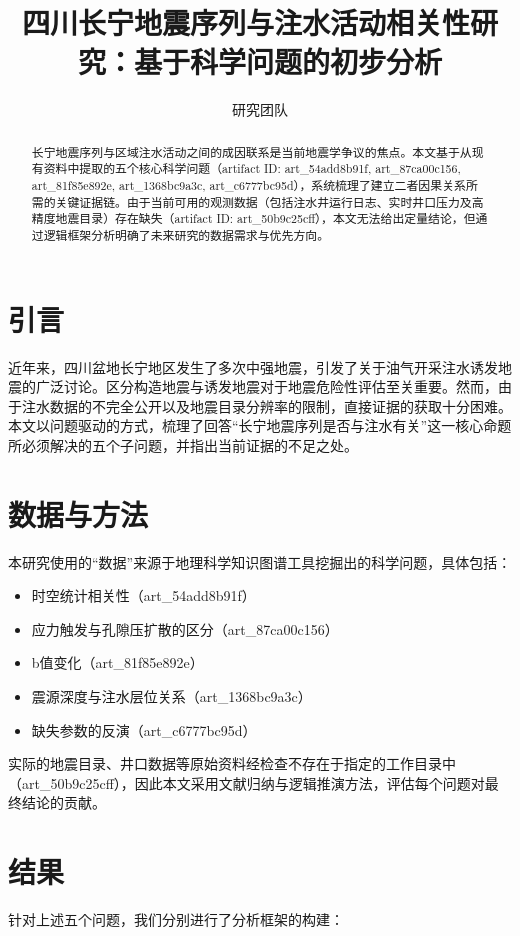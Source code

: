 \documentclass{ctexart}
\title{四川长宁地震序列与注水活动相关性研究：基于科学问题的初步分析}
\author{研究团队}
\date{}
\begin{document}
\maketitle

\begin{abstract}
长宁地震序列与区域注水活动之间的成因联系是当前地震学争议的焦点。本文基于从现有资料中提取的五个核心科学问题（artifact ID: art\_54add8b91f, art\_87ca00c156, art\_81f85e892e, art\_1368bc9a3c, art\_c6777bc95d），系统梳理了建立二者因果关系所需的关键证据链。由于当前可用的观测数据（包括注水井运行日志、实时井口压力及高精度地震目录）存在缺失（artifact ID: art\_50b9c25cff），本文无法给出定量结论，但通过逻辑框架分析明确了未来研究的数据需求与优先方向。
\end{abstract}

\section{引言}
近年来，四川盆地长宁地区发生了多次中强地震，引发了关于油气开采注水诱发地震的广泛讨论。区分构造地震与诱发地震对于地震危险性评估至关重要。然而，由于注水数据的不完全公开以及地震目录分辨率的限制，直接证据的获取十分困难。本文以问题驱动的方式，梳理了回答“长宁地震序列是否与注水有关”这一核心命题所必须解决的五个子问题，并指出当前证据的不足之处。

\section{数据与方法}
本研究使用的“数据”来源于地理科学知识图谱工具挖掘出的科学问题，具体包括：
\begin{itemize}
    \item 时空统计相关性（art\_54add8b91f）
    \item 应力触发与孔隙压扩散的区分（art\_87ca00c156）
    \item b值变化（art\_81f85e892e）
    \item 震源深度与注水层位关系（art\_1368bc9a3c）
    \item 缺失参数的反演（art\_c6777bc95d）
\end{itemize}
实际的地震目录、井口数据等原始资料经检查不存在于指定的工作目录中（art\_50b9c25cff），因此本文采用文献归纳与逻辑推演方法，评估每个问题对最终结论的贡献。

\section{结果}
针对上述五个问题，我们分别进行了分析框架的构建：
\end{document}
